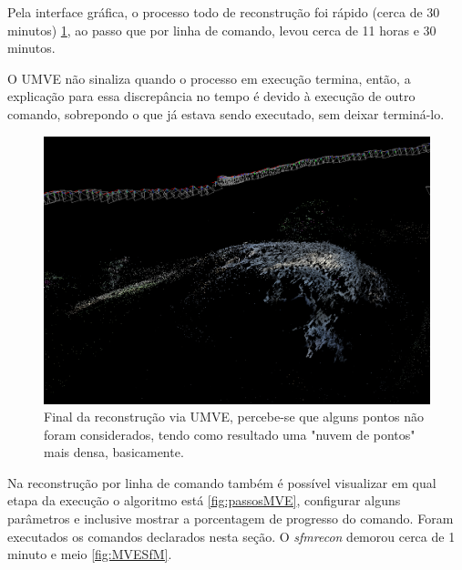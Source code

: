 Pela interface gráfica, o processo todo de reconstrução foi rápido (cerca de 30 minutos) \ref{fig:UMVEdense}, ao passo que por linha de comando, levou cerca de 11 horas e 30 minutos. 

O UMVE não sinaliza quando o processo em execução termina, então, a explicação para essa discrepância no tempo é devido à execução de outro comando, sobrepondo o que já estava sendo executado, sem deixar terminá-lo.

\begin{figure}[!h]
	\centering
	\includegraphics[width=0.5\linewidth]{figs/umvedense.png}
	\caption{%
	Final da reconstrução via UMVE, percebe-se que alguns pontos não foram considerados, tendo como resultado uma "nuvem de pontos" mais densa, basicamente.
	}\label{fig:UMVEdense}
\end{figure} 

Na reconstrução por linha de comando também é possível visualizar em qual etapa da execução o algoritmo está \ref{fig:passosMVE}, configurar alguns parâmetros e inclusive mostrar a porcentagem de progresso do comando. Foram executados os comandos declarados nesta seção.  O {\it sfmrecon} demorou cerca de 1 minuto e meio \ref{fig:MVESfM}.

